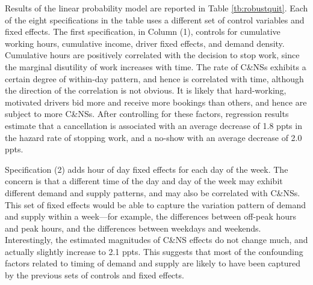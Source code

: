 \documentclass[reviewmode]{restud}
\begin{document}
Results of the linear probability model are reported in Table \ref{tb:robustquit}. Each of the eight specifications in the table uses a different set of control variables and fixed effects. The first specification, in Column (1), controls for cumulative working hours, cumulative income, driver fixed effects, and demand density.
Cumulative hours are positively correlated with the decision to stop work, since the marginal disutility of work increases with time. The rate of C\&NSs exhibits a certain degree of within-day pattern, and hence is correlated with time, although the direction of the correlation is not obvious. It is likely that hard-working, motivated drivers bid more and receive more bookings than others, and hence are subject to more C\&NSs. After controlling for these factors, regression results estimate that a cancellation is associated with an average decrease of 1.8 ppts in the hazard rate of stopping work, and a no-show with an average decrease of 2.0 ppts.

Specification (2) adds hour of day fixed effects for each day of the week. The concern is that a different time of the day and day of the week may exhibit different demand and supply patterns, and may also be correlated with C\&NSs. This set of fixed effects would be able to capture the variation pattern of demand and supply within a week---for example, the differences between off-peak hours and peak hours, and the differences between weekdays and weekends. Interestingly, the estimated magnitudes of C\&NS effects do not change much, and actually slightly increase to 2.1 ppts. This suggests that most of the confounding factors related to timing of demand and supply are likely to have been captured by the previous sets of controls and fixed effects. 
\end{document}
